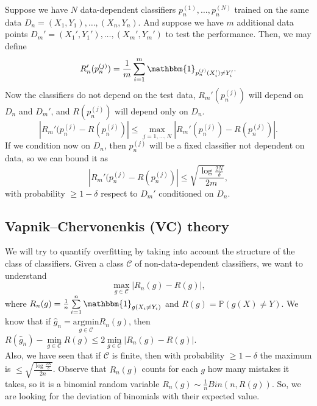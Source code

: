 \documentclass[11pt, english]{article}
\begin{document}
Suppose we have $N$ data-dependent classifiers $p_n^{(1)},\dots,p_n^{(N)}$ trained on the same data $D_n=(X_1,Y_1),\dots,(X_n,Y_n)$. And suppose we have $m$ additional data points $D_m'=(X_1',Y_1'),\dots,(X_m',Y_m')$ to test the performance. Then, we may define \begin{equation}
	R_n'(p_n^{(j)})=\frac{1}{m}\sum\limits_{i=1}^m\mathbbm{1}_{p_n^{(j)}(X_i')\neq Y_i'}.
\end{equation}
Now the classifiers do not depend on the test data, $R_m'(p_n^{(j)})$ will depend on $D_n$ and $D_m'$, and $R(p_n^{(j)})$ will depend only on $D_n$.
\begin{equation}
	|R_m'(p_n^{(j)}-R(p_n^{(j)})|\leq \underset{j=1,\dots,N}{\max}|R_m'(p_n^{(j)})-R(p_n^{(j)})|.
\end{equation}
If we condition now on $D_n$, then $p_n^{(j)}$ will be a fixed classifier not dependent on data, so we can bound it as
\begin{equation}
	|R_m'(p_n^{(j)}-R(p_n^{(j)})|\leq \sqrt{\frac{\log\frac{2N}{\delta}}{2m}},
\end{equation}
with probability $\geq 1-\delta$ respect to $D_m'$ conditioned on $D_n$. \\

\subsection{Vapnik–Chervonenkis (VC) theory}

We will try to quantify overfitting by taking into account the structure of the class of classifiers. Given a class $\mathcal{C}$ of non-data-dependent classifiers, we want to understand 
\begin{equation}
	\underset{g\in\mathcal{C}}{\max}|R_n(g)-R(g)|,
\end{equation}
where $R_n(g)=\frac{1}{n}\sum\limits_{i=1}^n\mathbbm{1}_{g(X_i\neq Y_i)}$ and $R(g)=\mathbb{P}(g(X)\neq Y)$. We know that if $\hat{g}_n=\underset{g\in\mathcal{C}}{\text{argmin}}R_n(g)$, then $R(\hat{g}_n)-\underset{g\in\mathcal{C}}{\min}R(g)\leq2\underset{g\in\mathcal{C}}{\min}|R_n(g)-R(g)|$.\\

Also, we have seen that if $\mathcal{C}$ is finite, then with probability $\geq 1-\delta$ the maximum is $\leq \sqrt{\frac{\log\frac{2N}{\delta}}{2n}}$. Observe that $R_n(g)$ counts for each $g$ how many mistakes it takes, so it is a binomial random variable $R_n(g)\sim \frac{1}{n}Bin(n,R(g))$. So, we are looking for the deviation of binomials with their expected value.\\
\end{document}
